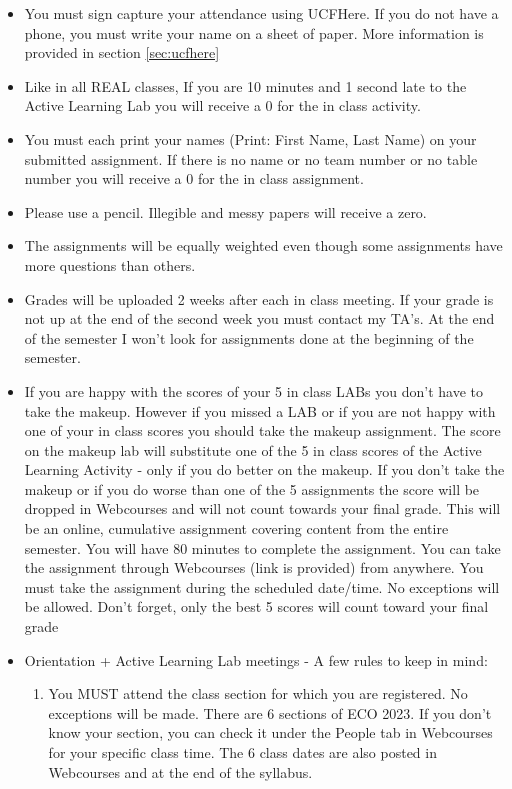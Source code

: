 \documentclass[11pt]{paper}
\begin{document}
\begin{itemize}
\item You must sign capture your attendance using UCFHere. If you do not have a phone, you must write your name on a sheet of paper. More information is provided in section \ref{sec:ucfhere}
\item Like in all REAL classes, If you are 10 minutes and 1 second late to the Active Learning Lab you will receive a 0 for the in class activity.
\item You must each print your names (Print: First Name, Last Name) on your submitted assignment. If there is no name or no team number or no table number you will receive a 0 for the in class assignment.
\item Please use a pencil. Illegible and messy papers will receive a zero.
\item The assignments will be equally weighted even though some assignments have more questions than others. 
\item Grades will be uploaded 2 weeks after each in class meeting. If your grade is not up at the end of the second week you must contact my TA’s. At the end of the semester I won’t look for assignments done at the beginning of the semester.
\item If you are happy with the scores of your 5 in class LABs you don’t have to take the makeup. However if you missed a LAB or if you are not happy with one of your in class scores you should take the makeup assignment. The score on the makeup lab will substitute one of the 5 in class scores of the Active Learning Activity - only if you do better on the makeup. If you don’t take the makeup or if you do worse than one of the 5 assignments the score will be dropped in Webcourses and will not count towards your final grade.
This will be an online, cumulative assignment covering content from the entire semester. You will have 80 minutes to complete the assignment. You can take the assignment through Webcourses (link is provided) from anywhere. You must take the assignment during the scheduled date/time. No exceptions will be allowed. Don’t forget, only the best 5 scores will count toward your final grade
\item Orientation + Active Learning Lab meetings - A few rules to keep in mind:
\begin{enumerate}
\item You MUST attend the class section for which you are registered. No exceptions will be made. There are 6 sections of ECO 2023. If you don’t know your section, you can check it under the People tab in Webcourses for your specific class time. The 6 class dates are also posted in Webcourses and at the end of the syllabus.

\end{enumerate}
\end{itemize}
\end{document}
